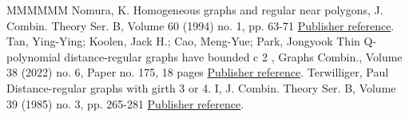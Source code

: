 \begin{thebibliography}{MMMMMM}
 Nomura, K. Homogeneous graphs and regular near polygons, J. Combin. Theory Ser. B, Volume 60 (1994) no. 1, pp. 63-71 \href{https://alco.centre-mersenne.org/articles/10.5802/alco.454/#Nomura1994}{Publisher reference}.
 Tan, Ying-Ying; Koolen, Jack H.; Cao, Meng-Yue; Park, Jongyook Thin Q-polynomial distance-regular graphs have bounded c 2 , Graphs Combin., Volume 38 (2022) no. 6, Paper no. 175, 18 pages \href{https://alco.centre-mersenne.org/articles/10.5802/alco.454/#TKCP2022}{Publisher reference}.
 Terwilliger, Paul Distance-regular graphs with girth 3 or 4. I, J. Combin. Theory Ser. B, Volume 39 (1985) no. 3, pp. 265-281 \href{https://alco.centre-mersenne.org/articles/10.5802/alco.454/#Terwilliger1985}{Publisher reference}.
\end{thebibliography}
